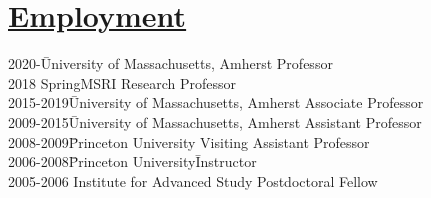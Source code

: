 \documentclass[11pt]{amsart}
\theoremstyle{plain}
\theoremstyle{definition}
\theoremstyle{remark}
\begin{document}
\section*{\Large\underline{Employment}}

\begin{tabbing}

2020-\quad\quad\quad\quad\;\;\;\= University of Massachusetts, Amherst\quad\quad\;\;\;  Professor\\
  
2018 Spring\quad\quad  MSRI \quad\quad\quad\quad\quad\quad\quad\quad\quad\quad\quad\quad\quad\quad\quad\quad\quad Research Professor\\
2015-2019\quad\quad\;\;\;\= University of Massachusetts, Amherst\quad\quad\;\;\; Associate Professor\\
2009-2015\quad\quad\;\;\;\= University of Massachusetts, Amherst\quad\quad\;\;\; Assistant Professor\\
2008-2009\quad\quad\;\;\;\= Princeton University\quad\quad\quad\quad\quad\quad\quad
\quad\quad\quad\;\; Visiting Assistant
Professor\\
 2006-2008\quad\quad\;\;\:\=        Princeton
University\quad\quad\quad\quad\quad\quad\quad\quad\quad\quad\quad\=
Instructor\\
2005-2006 \>Institute for Advanced Study\> Postdoctoral Fellow
\end{tabbing}









\end{document}
